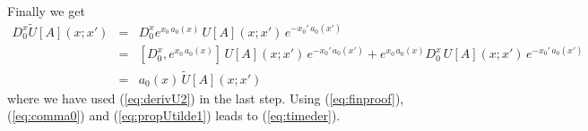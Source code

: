 \documentclass[a4paper,showpacs,showkeys,prd,nofootinbib]{revtex4}
\begin{document}
Finally we get
\begin{eqnarray}
D_0^x \tilde U[A](x;x') & = &
D_0^x e^{x_0 \, a_0(x)} \, U[A](x;x') \, e^{-x_0' \, a_0(x')} 
\nonumber \\
& = & \left[D_0^x , e^{x_0 \, a_0(x)} \right] \, U[A](x;x') \, e^{-x_0' \, a_0(x')} 
+ e^{x_0 \, a_0(x)} D_0^x \, U[A](x;x') \, e^{-x_0' \, a_0(x')} 
\nonumber \\
  \label{eq:finproof}
& = & a_0(x) \, \tilde U[A](x;x') 
\end{eqnarray}
where we have used (\ref{eq:derivU2}) in the last step. Using (\ref{eq:finproof}),
(\ref{eq:comma0}) and (\ref{eq:propUtilde1}) leads to (\ref{eq:timeder}).





\end{document}
